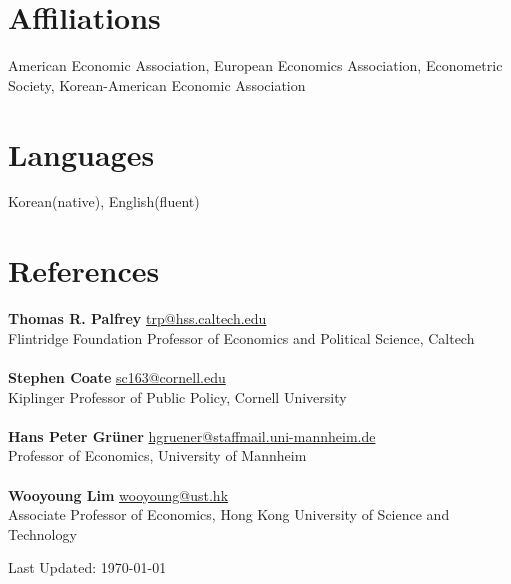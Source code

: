 \documentclass[margin, letterpaper]{res}
\begin{document}
\begin{resume}
\section{Affiliations} American Economic Association, European Economics Association, Econometric Society, Korean-American Economic Association

\section{Languages} Korean(native), English(fluent)

\section{References} \textbf{Thomas R. Palfrey} \href{mailto:trp@hss.caltech.edu}{trp@hss.caltech.edu}\\
Flintridge Foundation Professor of Economics and Political Science, Caltech\\\\
\textbf{Stephen Coate} \href{mailto:sc163@cornell.edu}{sc163@cornell.edu}\\
Kiplinger Professor of Public Policy, Cornell University\\\\
\textbf{Hans Peter Gr\"{u}ner} \href{mailto:hgruener@staffmail.uni-mannheim.de}{hgruener@staffmail.uni-mannheim.de}\\
Professor of Economics, University of Mannheim\\\\
\textbf{Wooyoung Lim} \href{mailto:wooyoung@ust.hk}{wooyoung@ust.hk}\\
Associate Professor of Economics, Hong Kong University of Science and Technology
\begin{flushright}
Last Updated: \today
\end{flushright}
\end{resume} 
\end{document}
